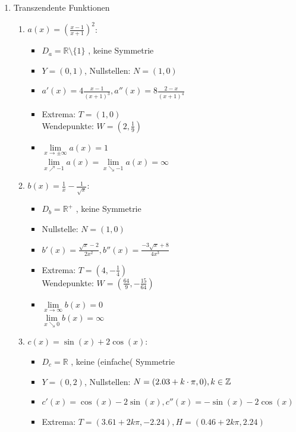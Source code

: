 \begin{enumerate}
    \item Transzendente Funktionen
    \begin{enumerate}
        \item \( a(x) = \left( \frac{x - 1}{x + 1} \right)^2 \): 
            \begin{itemize}
            \item $D_a = \mathbb{R} \setminus \{1\}$ , keine Symmetrie
            \item $Y = (0, 1)$, Nullstellen: $N = (1,0)$
            \item $a'(x) = 4 \frac{x-1}{(x+1)^3}, a''(x) =  8 \frac{2-x}{(x+1)^4}$
            \item Extrema: $T=(1, 0)$ \\
                  Wendepunkte: $W = (2, \frac{1}{9})$
            \item $\lim\limits_{x \to \pm\infty} a(x) = 1$ \\
                $\lim\limits_{x \nearrow -1} a(x) = \lim\limits_{x \searrow -1} a(x)=\infty $
        \end{itemize}
        \item \( b(x) = \frac{1}{x} - \frac{1}{\sqrt{x}} \):
             \begin{itemize}
            \item $D_b = \mathbb{R}^+ $ , keine Symmetrie
            \item Nullstelle: $N = (1,0)$
            \item $b'(x) = \frac{\sqrt{x}-2}{2x^2}, b''(x) =  \frac{-3\sqrt{x}+8}{4x^3}$
            \item Extrema: $T=(4, -\frac{1}{4})$ \\
                  Wendepunkte: $W = (\frac{64}{9}, -\frac{15}{64})$
            \item $\lim\limits_{x \to \infty} b(x) = 0$ \\
                $\lim\limits_{x \searrow 0} b(x)=\infty $
        \end{itemize}
        \item \( c(x) = \sin(x) + 2\cos(x) \): 
            \begin{itemize}
            \item $D_c = \mathbb{R}$ , keine (einfache( Symmetrie
            \item $Y = (0, 2)$, Nullstellen: $N = (2.03 +k\cdot \pi,0), k\in \mathbb{Z}$
            \item $c'(x) = \cos(x) - 2 \sin(x), c''(x) =  -\sin(x)-2\cos(x)$
            \item Extrema: $T=(3.61+2k\pi, -2.24), H=(0.46+2k\pi, 2.24)$ \\

\end{itemize}
\end{enumerate}
\end{enumerate}

